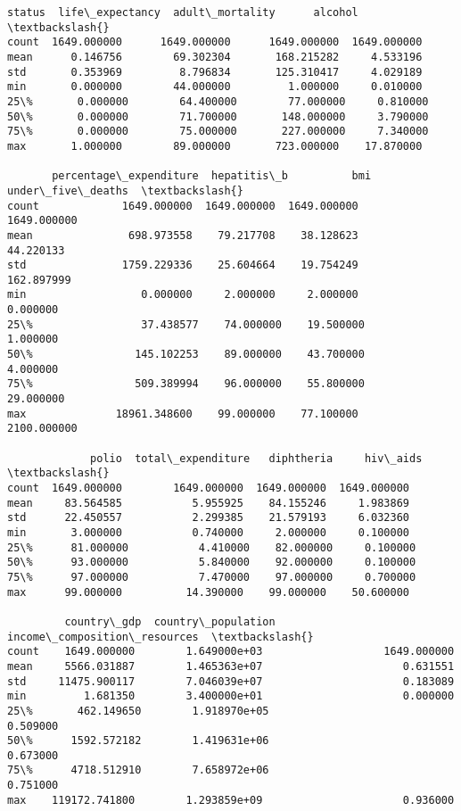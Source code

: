 \documentclass[11pt]{article}
\begin{document}
    \begin{Verbatim}[commandchars=\\\{\}]
            status  life\_expectancy  adult\_mortality      alcohol  \textbackslash{}
count  1649.000000      1649.000000      1649.000000  1649.000000
mean      0.146756        69.302304       168.215282     4.533196
std       0.353969         8.796834       125.310417     4.029189
min       0.000000        44.000000         1.000000     0.010000
25\%       0.000000        64.400000        77.000000     0.810000
50\%       0.000000        71.700000       148.000000     3.790000
75\%       0.000000        75.000000       227.000000     7.340000
max       1.000000        89.000000       723.000000    17.870000

       percentage\_expenditure  hepatitis\_b          bmi  under\_five\_deaths  \textbackslash{}
count             1649.000000  1649.000000  1649.000000        1649.000000
mean               698.973558    79.217708    38.128623          44.220133
std               1759.229336    25.604664    19.754249         162.897999
min                  0.000000     2.000000     2.000000           0.000000
25\%                 37.438577    74.000000    19.500000           1.000000
50\%                145.102253    89.000000    43.700000           4.000000
75\%                509.389994    96.000000    55.800000          29.000000
max              18961.348600    99.000000    77.100000        2100.000000

             polio  total\_expenditure   diphtheria     hiv\_aids  \textbackslash{}
count  1649.000000        1649.000000  1649.000000  1649.000000
mean     83.564585           5.955925    84.155246     1.983869
std      22.450557           2.299385    21.579193     6.032360
min       3.000000           0.740000     2.000000     0.100000
25\%      81.000000           4.410000    82.000000     0.100000
50\%      93.000000           5.840000    92.000000     0.100000
75\%      97.000000           7.470000    97.000000     0.700000
max      99.000000          14.390000    99.000000    50.600000

         country\_gdp  country\_population  income\_composition\_resources  \textbackslash{}
count    1649.000000        1.649000e+03                   1649.000000
mean     5566.031887        1.465363e+07                      0.631551
std     11475.900117        7.046039e+07                      0.183089
min         1.681350        3.400000e+01                      0.000000
25\%       462.149650        1.918970e+05                      0.509000
50\%      1592.572182        1.419631e+06                      0.673000
75\%      4718.512910        7.658972e+06                      0.751000
max    119172.741800        1.293859e+09                      0.936000


\end{Verbatim}
\end{document}
